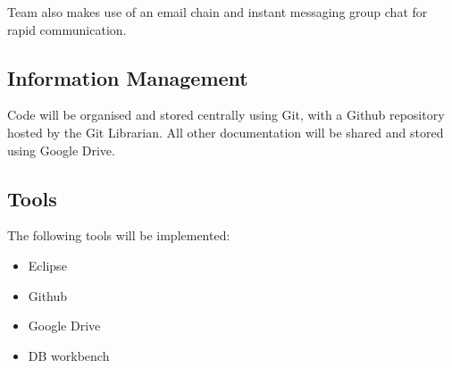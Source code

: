 \documentclass[11pt]{article}
\begin{document}
Team also makes use of an email chain and instant messaging group chat for rapid communication. 

\subsection*{Information Management}
Code will be organised and stored centrally using Git, with a Github repository hosted by the Git Librarian.
All other documentation will be shared and stored using Google Drive.
\subsection*{Tools}
The following tools will be implemented:
\begin{itemize}
\item Eclipse
\item Github
\item Google Drive
\item DB workbench
\end{itemize}
\end{document}
